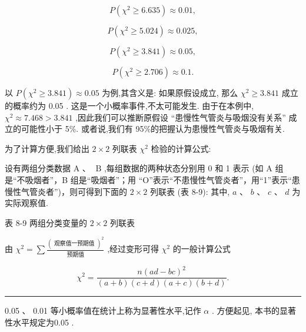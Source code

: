 \documentclass[10pt]{article}
\newcommand{\HRule}{\begin{center}\rule{0.9\linewidth}{0.2mm}\end{center}}
\newcommand*\circled[1]{\tikz[baseline=(char.base)]{\node[shape=circle,draw,inner sep=1.5pt] (char) {\small #1};}}
\begin{document}
\[
P\left( {{\chi }^{2} \geq  {6.635}}\right)  \approx  {0.01},
\]

\[
P\left( {{\chi }^{2} \geq  {5.024}}\right)  \approx  {0.025},
\]

\[
P\left( {{\chi }^{2} \geq  {3.841}}\right)  \approx  {0.05},
\]

\[
P\left( {{\chi }^{2} \geq  {2.706}}\right)  \approx  {0.1}.
\]

以 \(P\left( {{\chi }^{2} \geq  {3.841}}\right)  \approx  {0.05}\) 为例,其含义是: 如果原假设成立, 那么 \({\chi }^{2} \geq  {3.841}\) 成立的概率约为 0.05 . 这是一个小概率事件,不太可能发生. 由于在本例中, \({\chi }^{2} \approx  {7.468} > {3.841}\) ,因此我们可以推断原假设 “患慢性气管炎与吸烟没有关系” 成立的可能性小于 5\%. 或者说,我们有 95\%的把握认为患慢性气管炎与吸烟有关.

为了计算方便,我们给出 \(2 \times  2\) 列联表 \({\chi }^{2}\) 检验的计算公式:

设有两组分类数据 \(\mathrm{A}\text{ 、 }\mathrm{\;B}\) ,每组数据的两种状态分别用 0 和 1 表示 (如 A 组是“不吸烟者”，B 组是“吸烟者”；用 “O”表示“不患慢性气管炎者”，用“1”表示“患慢性气管炎者”)，则可得到下面的 \(2 \times  2\) 列联表 (表 8-9): 其中, \(a\text{ 、 }b\text{ 、 }c\text{ 、 }d\) 为实际观察值.

表 8-9 两组分类变量的 \(2 \times  2\) 列联表

\begin{center}
\end{center}

由 \({\chi }^{2} = \sum \frac{{\left( \text{ 观察值一预期值 }\right) }^{2}}{\text{ 预期值 }}\) ,经过变形可得 \({\chi }^{2}\) 的一般计算公式



\[
{\chi }^{2} = \frac{n{\left( ad - bc\right) }^{2}}{\left( {a + b}\right) \left( {c + d}\right) \left( {a + c}\right) \left( {b + d}\right) }.
\]
  \circled{1} 

\HRule

0.05 、 0.01 等小概率值在统计上称为显著性水平,记作 \(\alpha\) . 方便起见, 本书的显著性水平规定为0.05 .
\end{document}
